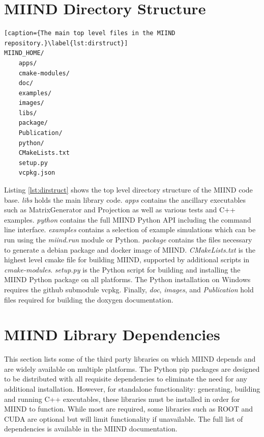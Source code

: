 \documentclass[utf8]{frontiers_suppmat} %
\begin{document}
\onecolumn
{}

\title[Supplementary Material]{{}}

\maketitle

\section {MIIND Directory Structure}
\label{directorystructure}

\begin{lstlisting}[caption={The main top level files in the MIIND repository.}\label{lst:dirstruct}]
MIIND_HOME/
    apps/
    cmake-modules/
    doc/
    examples/
    images/
    libs/
    package/
    Publication/
    python/
    CMakeLists.txt
    setup.py
    vcpkg.json
\end{lstlisting}

Listing \ref{lst:dirstruct} shows the top level directory structure of the MIIND code base. \textit{libs} holds the main library code. \textit{apps} contains the ancillary executables such as MatrixGenerator and Projection as well as various tests and C++ examples. \textit{python} contains the full MIIND Python API including the command line interface. \textit{examples} contains a selection of example simulations which can be run using the \textit{miind.run} module or Python. \textit{package} contains the files necessary to generate a debian package and docker image of MIIND. \textit{CMakeLists.txt} is the highest level cmake file for building MIIND, supported by additional scripts in \textit{cmake-modules}. \textit{setup.py} is the Python script for building and installing the MIIND Python package on all platforms. The Python installation on Windows requires the github submodule vcpkg. Finally, \textit{doc}, \textit{images}, and \textit{Publication} hold files required for building the doxygen documentation. 

\section{MIIND Library Dependencies}
\label{miinddependencies}
This section lists some of the third party libraries on which MIIND depends and are widely available on multiple platforms. The Python pip packages are designed to be distributed with all requisite dependencies to eliminate the need for any additional installation. However, for standalone functionality: generating, building and running C++ executables, these libraries must be installed in order for MIIND to function. While most are required, some libraries such as ROOT and CUDA are optional but will limit functionality if unavailable. The full list of dependencies is available in the MIIND documentation.\\
\end{document}
